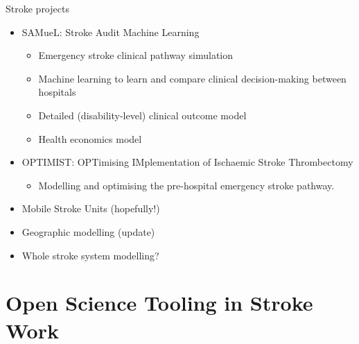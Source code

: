\documentclass[xcolor={usenames,dvipsnames}]{beamer}
\begin{document}
\begin{frame}{Stroke projects}

\begin{itemize}
    \setlength\itemsep{2.5mm}
    \item SAMueL: Stroke Audit Machine Learning 
    \begin{itemize}
        \item Emergency stroke clinical pathway simulation
        \item Machine learning to learn and compare clinical decision-making between hospitals
        \item Detailed (disability-level) clinical outcome model
        \item Health economics model
    \end{itemize}
    \item OPTIMIST: OPTimising IMplementation of Ischaemic Stroke Thrombectomy
        \begin{itemize}
            \item Modelling and optimising the pre-hospital emergency stroke pathway.
        \end{itemize}
    \item Mobile Stroke Units (hopefully!)
    \item Geographic modelling (update)
    \item Whole stroke system modelling?
\end{itemize}
    
\end{frame}


\section{Open Science Tooling in Stroke Work}
\end{document}
